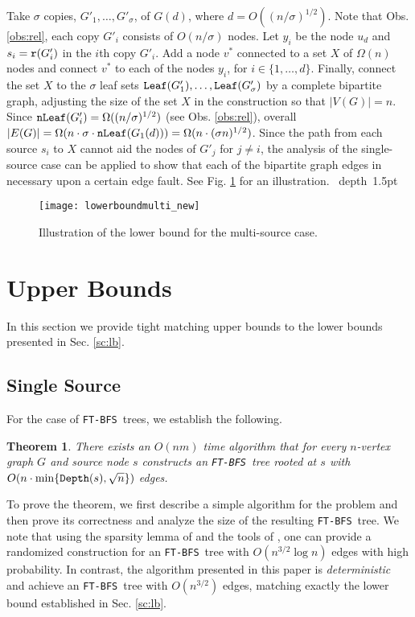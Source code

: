 \documentclass[12pt]{article}
\newtheorem{theorem}{Theorem}[section]
\def\blackslug{\hbox{\hskip 1pt \vrule width 4pt height 8pt
    depth 1.5pt \hskip 1pt}}
\def\QED{\quad\blackslug\lower 8.5pt\null\par}
\def\NSource{\sigma}
\def\Root{\mbox{\tt r}}
\def\Leaf{\mbox{\tt Leaf}}
\def\NLeaf{\mbox{\tt nLeaf}}
\def\Depth{\mbox{\tt Depth}}
\def\FTBFS{\mbox{\tt FT-BFS}}
\begin{document}
Take $\NSource$ copies, $G'_1, \ldots, G'_\NSource$, of $G(d)$,
where $d=O((n / \NSource)^{1/2})$.
Note that Obs. \ref{obs:rel}, each copy $G'_i$ consists of $O(n/\NSource)$
nodes.
Let $y_i$ be the node $u_d$ and $s_i=\Root(G'_i)$ in the $i$th copy $G'_i$.
Add a node $v^*$ connected to a set $X$ of $\Omega(n)$ nodes and connect $v^*$
to each of the nodes $y_i$, for $i \in \{1, \ldots, d\}$.
Finally, connect the set $X$ to the $\NSource$ leaf sets
$\Leaf(G'_1), \ldots, \Leaf(G'_\NSource)$ by a complete bipartite graph,
adjusting the size of the set $X$ in the construction so that $|V(G)|=n$.
Since $\NLeaf(G'_i)=\Omega((n / \NSource)^{1/2})$ (see Obs. \ref{obs:rel}),
overall $|E(G)| = \Omega(n \cdot \NSource \cdot \NLeaf(G_1(d))) =
\Omega(n\cdot(\NSource n)^{1/2})$.
Since the path from each source $s_i$ to $X$ cannot aid the nodes of $G'_j$
for $j \neq i$, the analysis of the single-source case can be applied
to show that each of the bipartite graph edges in necessary
upon a certain edge fault.
See Fig. \ref{fig:lowerboundmulti} for an illustration.
\QED

\begin{figure}[h!]
\begin{center}
\texttt{[image: lowerboundmulti\_new]}
\caption{\label{fig:lowerboundmulti}
Illustration of the lower bound for the multi-source case.}
\end{center}
\end{figure}



\section{Upper Bounds}
\label{sec:upper}
In this section we provide tight matching upper bounds to the lower bounds
presented in Sec. \ref{sc:lb}.

\subsection{Single Source}
\label{subsec:1edge_alg}
For the case of \FTBFS\ trees, we establish the following.
\begin{theorem}
There exists an $O(n m)$ time algorithm that for every $n$-vertex graph $G$
and source node $s$ constructs an \FTBFS\ tree rooted at $s$ with
$O(n \cdot \min\{\Depth(s), \sqrt{n}\})$ edges.
\end{theorem}
To prove the theorem, we first describe a simple algorithm for the problem
and then prove its correctness and analyze the size
of the resulting \FTBFS\ tree.
We note that using the sparsity lemma of \cite{RTREP05} and the tools of
\cite{GW12}, one can provide a randomized construction for an \FTBFS\ tree
with $O(n^{3/2} \log n)$ edges with high probability.
In contrast, the algorithm presented in this paper is
\emph{deterministic} and achieve an \FTBFS\ tree with $O(n^{3/2})$ edges,
matching exactly the lower bound established in Sec. \ref{sc:lb}.
\end{document}
